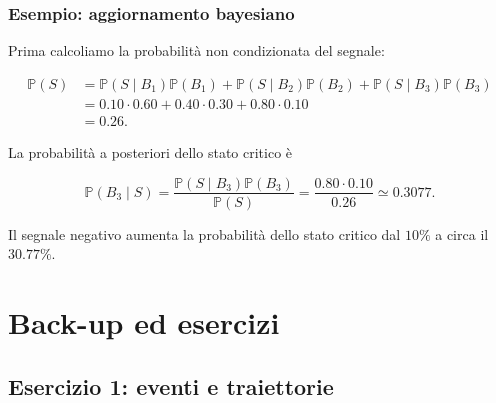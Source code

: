 \documentclass[handout]{beamer}%
\providecommand{\Prob}{\mathbb{P}}
\providecommand{\1}{\mathbf{1}}
\providecommand{\QTR}[2]{\csname #1\endcsname{#2}}
\begin{document}
\begin{frame}%
%

\frametitle{Esempio: aggiornamento bayesiano}%


Prima calcoliamo la probabilit\`{a} non condizionata del segnale:%

\[
\begin{aligned}
\Prob(S)
&=
\Prob(S\mid B_1)\Prob(B_1)
+\Prob(S\mid B_2)\Prob(B_2)
+\Prob(S\mid B_3)\Prob(B_3)\\
&=
0.10\cdot 0.60
+0.40\cdot 0.30
+0.80\cdot 0.10\\
&=0.26.
\end{aligned}
\]


\medskip

La probabilit\`{a} a posteriori dello stato critico \`{e}%

\[
\Prob(B_{3}\mid S) = \frac{\Prob(S\mid B_{3})\Prob(B_{3})}{\Prob(S)} =
\frac{0.80\cdot0.10}{0.26} \simeq0.3077.
\]


\medskip

Il segnale negativo aumenta la probabilit\`{a} dello stato critico dal $10\%$
a circa il $30.77\%$.%

\transboxout
\end{frame}%




\section{Back-up ed esercizi}

\subsection{Esercizio 1: eventi e traiettorie}%
\end{document}
